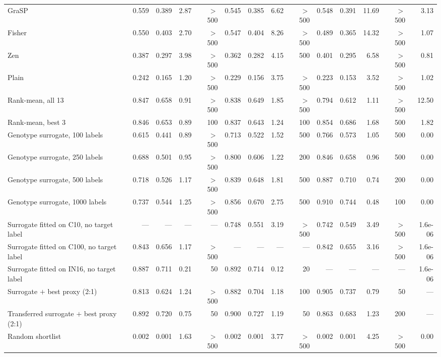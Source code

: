 \begin{table}[t]
{\begin{tabular}{l rrrr rrrr rrrr r}
\quad GraSP & 0.559 & 0.389 & 2.87 & $>$500 & 0.545 & 0.385 & 6.62 & $>$500 & 0.548 & 0.391 & 11.69 & $>$500 & 3.13 \\
\quad Fisher & 0.550 & 0.403 & 2.70 & $>$500 & 0.547 & 0.404 & 8.26 & $>$500 & 0.489 & 0.365 & 14.32 & $>$500 & 1.07 \\
\quad Zen & 0.387 & 0.297 & 3.98 & $>$500 & 0.362 & 0.282 & 4.15 & 500 & 0.401 & 0.295 & 6.58 & $>$500 & 0.81 \\
\quad Plain & 0.242 & 0.165 & 1.20 & $>$500 & 0.229 & 0.156 & 3.75 & $>$500 & 0.223 & 0.153 & 3.52 & $>$500 & 1.02 \\
\addlinespace[2pt]\midrule
\quad Rank-mean, all 13 & 0.847 & 0.658 & 0.91 & $>$500 & 0.838 & 0.649 & 1.85 & $>$500 & 0.794 & 0.612 & 1.11 & $>$500 & 12.50 \\
\quad Rank-mean, best 3 & 0.846 & 0.653 & 0.89 & 100 & 0.837 & 0.643 & 1.24 & 100 & 0.854 & 0.686 & 1.68 & 500 & 1.82 \\
\addlinespace[2pt]\midrule
\quad Genotype surrogate, 100 labels & 0.615 & 0.441 & 0.89 & $>$500 & 0.713 & 0.522 & 1.52 & 500 & 0.766 & 0.573 & 1.05 & 500 & 0.00 \\
\quad Genotype surrogate, 250 labels & 0.688 & 0.501 & 0.95 & $>$500 & 0.800 & 0.606 & 1.22 & 200 & 0.846 & 0.658 & 0.96 & 500 & 0.00 \\
\quad Genotype surrogate, 500 labels & 0.718 & 0.526 & 1.17 & $>$500 & 0.839 & 0.648 & 1.81 & 500 & 0.887 & 0.710 & 0.74 & 200 & 0.00 \\
\quad Genotype surrogate, 1000 labels & 0.737 & 0.544 & 1.25 & $>$500 & 0.856 & 0.670 & 2.75 & 500 & 0.910 & 0.744 & 0.48 & 100 & 0.00 \\
\quad Surrogate fitted on C10, no target label & --- & --- & --- & --- & 0.748 & 0.551 & 3.19 & $>$500 & 0.742 & 0.549 & 3.49 & $>$500 & 1.6e-06 \\
\quad Surrogate fitted on C100, no target label & 0.843 & 0.656 & 1.17 & $>$500 & --- & --- & --- & --- & 0.842 & 0.655 & 3.16 & $>$500 & 1.6e-06 \\
\quad Surrogate fitted on IN16, no target label & 0.887 & 0.711 & 0.21 & 50 & 0.892 & 0.714 & 0.12 & 20 & --- & --- & --- & --- & 1.6e-06 \\
\quad Surrogate $+$ best proxy (2:1) & 0.813 & 0.624 & 1.24 & $>$500 & 0.882 & 0.704 & 1.18 & 100 & 0.905 & 0.737 & 0.79 & 50 & --- \\
\quad Transferred surrogate $+$ best proxy (2:1) & 0.892 & 0.720 & 0.75 & 50 & 0.900 & 0.727 & 1.19 & 50 & 0.863 & 0.683 & 1.23 & 200 & --- \\
\quad Random shortlist & 0.002 & 0.001 & 1.63 & $>$500 & 0.002 & 0.001 & 3.77 & $>$500 & 0.002 & 0.001 & 4.25 & $>$500 & 0.00 \\
\bottomrule
\end{tabular}}
\end{table}
